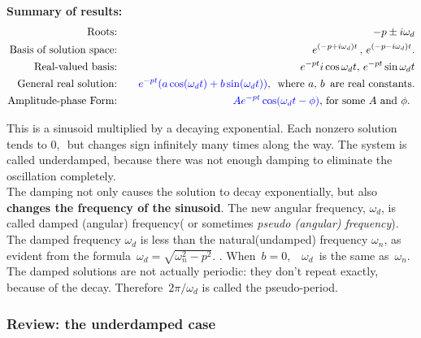 \textbf{Summary of results:}
\begin{eqnarray*}
  \text{Roots:}  & \quad
  & -p \pm i \omega _ d \\
  \text{Basis of solution space:} & \quad
  & \displaystyle e^{(-p + i \omega _ d) t}\, , \, e^{(-p -i\omega _ d) t}. \\
  \text{Real-valued basis:} & \quad
  & \displaystyle e^{-p t}  i\cos \omega _ d t, \, e^{-p t} \sin \omega _ d t \\
  \text{General real solution:}	& \quad
  & \displaystyle {\color{blue}{e^{-p t} (a \cos (\omega _ d t) + b \sin (\omega _ d t))}}
    , \, \text{ where $a, \, b \, $ are real constants.} \\
  \text{Amplitude-phase Form:}	& \quad
  & \displaystyle {\color{blue}{A e^{-pt}\cos (\omega _ d t - \phi ) }}
    , \, \text{for some $A$ and $\phi$. }
\end{eqnarray*}

This is a sinusoid multiplied by a decaying exponential. Each nonzero solution tends to $0 , \,$
but changes sign infinitely many times along the way.
The system is called {\color{blue} underdamped}, because there was not enough damping
to eliminate the oscillation completely.\\

The damping not only causes the solution to decay exponentially, but also
\textbf{ changes the frequency of the sinusoid}.
The new angular frequency, $\omega _ d$, is called {\color{blue}damped (angular) frequency}( or
sometimes \textit{pseudo (angular) frequency}). \\

The damped frequency $\omega _d$ is less than the natural(undamped) frequency $\omega _n$, as evident
from the formula $\, \omega _ d=\sqrt {\omega _ n^2-p^2}.\, \,$.
When $\, b=0,$ \, $\omega _ d\,$ is the same as $\, \omega _ n$. \\

The damped solutions are not actually periodic:
they don't repeat exactly, because of the decay.
Therefore $\, 2\pi /\omega _ d$  is called the {\color{blue}pseudo-period}.
\subsubsection{Review: the underdamped case}





